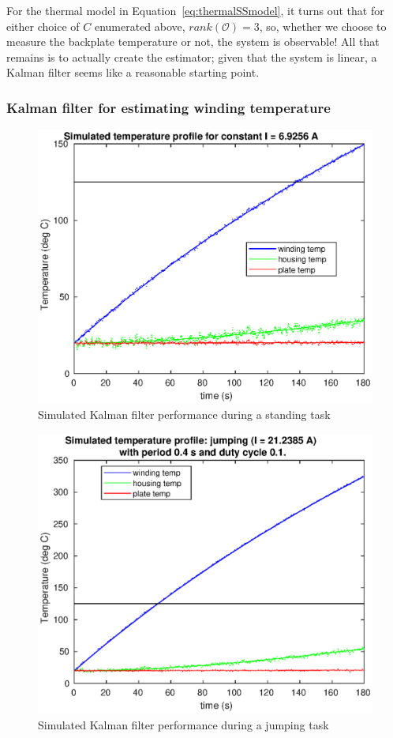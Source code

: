 \documentclass{report}
\begin{document}
For the thermal model in Equation~\ref{eq:thermalSSmodel}, it turns out that for either choice of $C$ enumerated above, $rank(\mathcal{O}) = 3$, so, whether we choose to measure the backplate temperature or not, the system is observable! All that remains is to actually create the estimator; given that the system is linear, a Kalman filter seems like a reasonable starting point.

\subsubsection[Kalman filter for estimating winding temperature]{Kalman filter for estimating winding temperature}
\begin{figure}[H]
	\centering
	\includegraphics[width=0.7\linewidth]{thermal/Kalman_comparison_standing.eps}
	\caption{Simulated Kalman filter performance during a standing task}
	\label{fig:Kalman_sim_standing}
\end{figure}

\begin{figure}[H]
	\centering
	\includegraphics[width=0.7\linewidth]{thermal/Kalman_comparison_jumping.eps}
	\caption{Simulated Kalman filter performance during a jumping task}
	\label{fig:Kalman_sim_jumping}
\end{figure}
\end{document}
